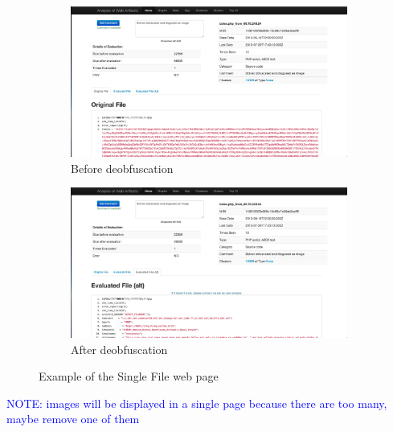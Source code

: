 \begin{figure}
\centering
\begin{subfigure}{.5\textwidth}
  \centering
  \includegraphics[width=1.0\linewidth]{Images/obf_file.jpg}
  \caption{Before deobfuscation}
  \label{fig:sub1}
\end{subfigure}%
\begin{subfigure}{.5\textwidth}
  \centering
  \includegraphics[width=1.0\linewidth]{Images/deobf_file.jpg}
  \caption{After deobfuscation}
  \label{fig:sub2}
\end{subfigure}
\caption{Example of the Single File web page}
\label{fig:test}
\end{figure}

\textcolor{blue}{NOTE: images will be displayed in a single page because there are too many, maybe remove one of them}
